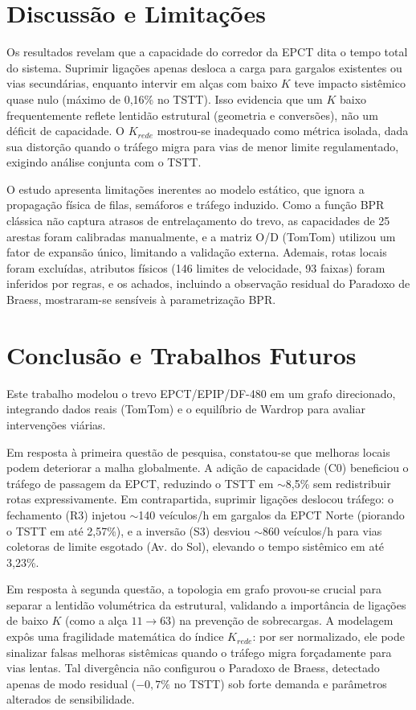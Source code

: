 \documentclass[portuguese]{sbc2025}%
\begin{document}
\section{Discussão e Limitações}
Os resultados revelam que a capacidade do corredor da EPCT dita o tempo total do sistema. Suprimir ligações apenas desloca a carga para gargalos existentes ou vias secundárias, enquanto intervir em alças com baixo $K$ teve impacto sistêmico quase nulo (máximo de 0,16\% no TSTT). Isso evidencia que um $K$ baixo frequentemente reflete lentidão estrutural (geometria e conversões), não um déficit de capacidade. O $K_{rede}$ mostrou-se inadequado como métrica isolada, dada sua distorção quando o tráfego migra para vias de menor limite regulamentado, exigindo análise conjunta com o TSTT.

O estudo apresenta limitações inerentes ao modelo estático, que ignora a propagação física de filas, semáforos e tráfego induzido. Como a função BPR clássica não captura atrasos de entrelaçamento do trevo, as capacidades de 25 arestas foram calibradas manualmente, e a matriz O/D (TomTom) utilizou um fator de expansão único, limitando a validação externa. Ademais, rotas locais foram excluídas, atributos físicos (146 limites de velocidade, 93 faixas) foram inferidos por regras, e os achados, incluindo a observação residual do Paradoxo de Braess, mostraram-se sensíveis à parametrização BPR.

\section{Conclusão e Trabalhos Futuros}
Este trabalho modelou o trevo EPCT/EPIP/DF-480 em um grafo direcionado, integrando dados reais (TomTom) e o equilíbrio de Wardrop para avaliar intervenções viárias. 

Em resposta à primeira questão de pesquisa, constatou-se que melhoras locais podem deteriorar a malha globalmente. A adição de capacidade (C0) beneficiou o tráfego de passagem da EPCT, reduzindo o TSTT em $\sim$8,5\% sem redistribuir rotas expressivamente. Em contrapartida, suprimir ligações deslocou tráfego: o fechamento (R3) injetou $\sim$140 veículos/h em gargalos da EPCT Norte (piorando o TSTT em até 2,57\%), e a inversão (S3) desviou $\sim$860 veículos/h para vias coletoras de limite esgotado (Av. do Sol), elevando o tempo sistêmico em até 3,23\%.

Em resposta à segunda questão, a topologia em grafo provou-se crucial para separar a lentidão volumétrica da estrutural, validando a importância de ligações de baixo $K$ (como a alça $11\rightarrow63$) na prevenção de sobrecargas. A modelagem expôs uma fragilidade matemática do índice $K_{rede}$: por ser normalizado, ele pode sinalizar falsas melhoras sistêmicas quando o tráfego migra forçadamente para vias lentas. Tal divergência não configurou o Paradoxo de Braess, detectado apenas de modo residual ($-0{,}7\%$ no TSTT) sob forte demanda e parâmetros alterados de sensibilidade.
\end{document}
